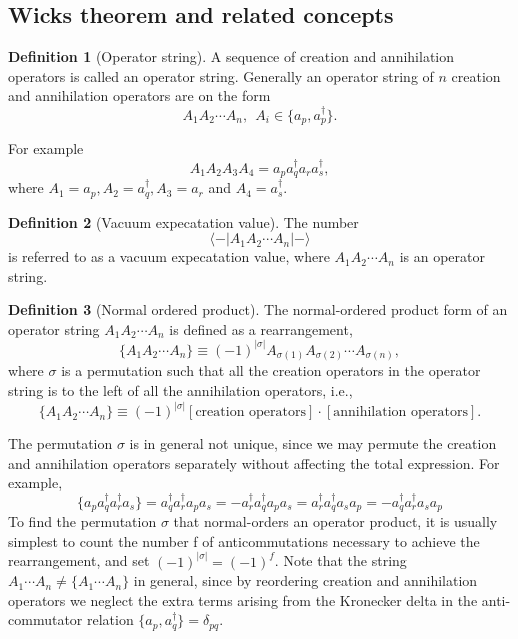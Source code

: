\documentclass[a4paper,10pt]{article}
\newcommand{\braket}[1]{\langle#1\rangle}
\theoremstyle{definition}
\newtheorem{definition}{Definition}
\begin{document}
\subsection{Wicks theorem and related concepts}
\begin{definition}[Operator string]
 A sequence of creation and annihilation operators is called an operator string. Generally an operator 
string of $n$ creation and annihilation operators are on the form 
\begin{equation}
 A_1 A_2 \cdots A_n, \ \ A_i \in \{a_p,a_p^\dagger\}.
\end{equation}

For example
$$A_1A_2A_3A_4 = a_p a_q^\dagger a_r a_s^\dagger,$$
where $A_1 = a_p, A_2 = a_q^\dagger, A_3 = a_r$ and $A_4 = a_s^\dagger$.
\end{definition}
\begin{definition}[Vacuum expecatation value]
The number 
\begin{equation}
 \braket{-|A_1 A_2 \cdots A_n|-}
\end{equation}
is referred to as a vacuum expecatation value, where $A_1A_2 \cdots A_n$ is an operator string. 
\end{definition}
\begin{definition}[Normal ordered product]
The normal-ordered product form of an operator 
string $A_1A_2\cdots A_n$ is defined as a rearrangement,
\begin{equation}
 \{A_1A_2\cdots A_n \} \equiv (-1)^{|\sigma|}A_{\sigma(1)}A_{\sigma(2)}\cdots A_{\sigma(n)},
\end{equation}
where $\sigma$ is a permutation such that all the creation operators in the operator string is to the left of all the
annihilation operators, i.e.,
\begin{equation}
 \{A_1A_2\cdots A_n \} \equiv (-1)^{|\sigma|}[\text{creation operators}]\cdot[\text{annihilation operators}].
\end{equation}
\end{definition}
The permutation $\sigma$ is in general not unique, since we may permute the creation and annihilation
operators separately without affecting the total expression. For example,
\begin{equation}
 \{a_p a_q^\dagger a_r^\dagger a_s \} = a_q^\dagger a_r^\dagger a_p a_s = -a_r^\dagger a_q^\dagger a_p a_s = a_r^\dagger a_q^\dagger a_s a_p = -a_q^\dagger a_r^\dagger a_s a_p
\end{equation}
To find the permutation $\sigma$ that normal-orders an operator product, it is usually simplest to count the
number f of anticommutations necessary to achieve the rearrangement, and set $(-1)^{|\sigma |} = (-1)^f$.
Note that the string $A_1\cdots A_n \neq \{ A_1 \cdots A_n \}$ in general, since by reordering creation and annihilation
operators we neglect the extra terms arising from the Kronecker delta in the anti-commutator relation
$\{ a_p , a_q^\dagger \} = \delta_{pq}$.
\end{document}
